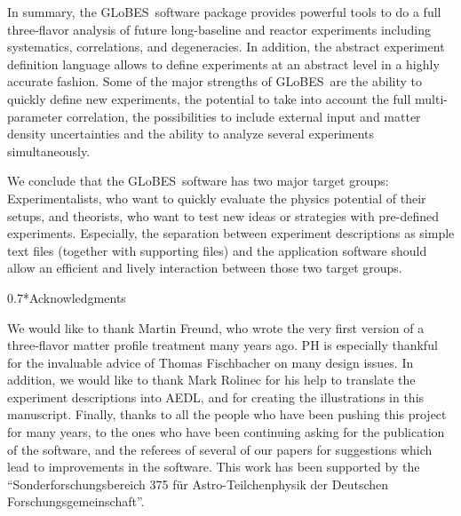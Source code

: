 \documentclass[12pt,a4paper]{article}
\makeatletter
\renewcommand{\subsection}%
{\@startsection{subsection}{2}{0em}{-0.7\baselineskip}%
{0.7\baselineskip}{\normalfont\bfseries}}
\newcommand{\GLOBES}{{\sf GLoBES}}
\newcommand{\AEDL}{{\sf AEDL}}
\makeatother
\begin{document}
In summary, the \GLOBES\ software package provides powerful tools
to do a full three-flavor analysis of future long-baseline and reactor
 experiments
including systematics, correlations, and degeneracies. In addition,
the abstract experiment definition language allows to define
experiments at an abstract level in a highly accurate fashion. 
Some of the major strengths of \GLOBES\ are the ability to quickly
define new experiments, the potential to take into account the
full multi-parameter correlation, the possibilities to include
external input and matter density uncertainties and 
the ability to analyze several experiments simultaneously.

We conclude that the \GLOBES\ software has two major target groups:
Experimentalists, who want to quickly evaluate the physics potential
of their setups, and theorists, who want to test new ideas or
strategies with pre-defined experiments. Especially, the separation
between experiment descriptions as simple text files (together
with supporting files) and the application software should allow an
efficient and lively interaction between those two target groups.

\subsection*{Acknowledgments}

We would like to thank Martin Freund, who wrote the very first
version of a three-flavor matter profile treatment many years ago.
PH is especially thankful for the invaluable advice of Thomas Fischbacher on
many design issues. 
In addition, we would like to thank
Mark Rolinec for his help to translate the experiment descriptions
into \AEDL , and for creating the illustrations in this manuscript.
Finally, thanks to all the people who have been pushing this project
for many years, to the ones who have been continuing asking for the 
publication of the software, and the referees of several of our
papers for suggestions which lead to improvements in the software.
This work has been supported by the ``Sonderforschungsbereich
375 f\"ur Astro-Teilchenphysik der Deutschen Forschungsgemeinschaft''.



\newpage


\end{document}
